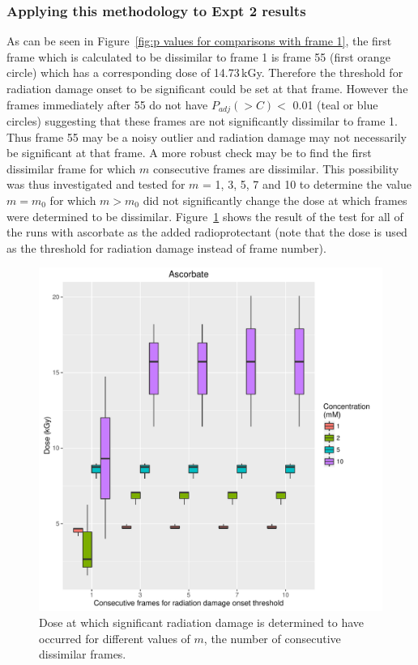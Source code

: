 \subsubsection{Applying this methodology to Expt 2 results}
\label{subs:Applying this methodology to Expt 2 results}
As can be seen in Figure~\ref{fig:p values for comparisons with frame 1}, the first frame which is calculated to be dissimilar to frame 1 is frame 55 (first orange circle) which has a corresponding dose of 14.73$\,$kGy.
Therefore the threshold for radiation damage onset to be significant could be set at that frame.
However the frames immediately after 55 do not have $P_{adj}(>C) <$ 0.01 (teal or blue circles) suggesting that these frames are not significantly dissimilar to frame 1.
Thus frame 55 may be a noisy outlier and radiation damage may not necessarily be significant at that frame.
A more robust check may be to find the first dissimilar frame for which $m$ consecutive frames are dissimilar.
This possibility was thus investigated and tested for $m$ = 1, 3, 5, 7 and 10 to determine the value $m = m_0$ for which $m > m_0$ did not significantly change the dose at which frames were determined to be dissimilar.
Figure~\ref{fig:Num consecutive frame test} shows the result of the test for all of the runs with ascorbate as the added radioprotectant (note that the dose is used as the threshold for radiation damage instead of frame number).
\begin{figure}
    \centering
    \includegraphics[width=1.0\textwidth]{figures/saxs/Ascorbate_Num_consec_fr_comp.pdf}
    \caption[Dose at which significant radiation damage is determined to have occurred for different values of $m$, the number of consecutive dissimilar frames.]{Dose at which significant radiation damage is determined to have occurred for different values of $m$, the number of consecutive dissimilar frames.}
    \label{fig:Num consecutive frame test}
\end{figure}

